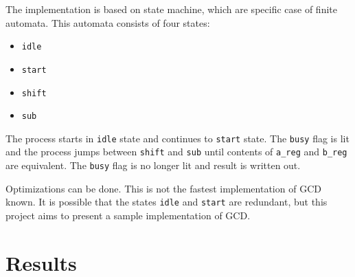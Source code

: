 \documentclass{article}
\begin{document}
The implementation is based on state machine, which are specific case of finite automata. This automata consists of four states:

\begin{itemize}
\item \texttt{idle}
\item \texttt{start}
\item \texttt{shift}
\item \texttt{sub}
\end{itemize}

The process starts in \texttt{idle} state and continues to \texttt{start} state. The \texttt{busy} flag is lit and the process jumps between \texttt{shift} and \texttt{sub} until contents of \texttt{a\_reg} and \texttt{b\_reg} are equivalent. The \texttt{busy} flag is no longer lit and result is written out.

Optimizations can be done. This is not the fastest implementation of GCD known. It is possible that the states \texttt{idle} and \texttt{start} are redundant, but this project aims to present a sample implementation of GCD.

\section{Results}
\end{document}
